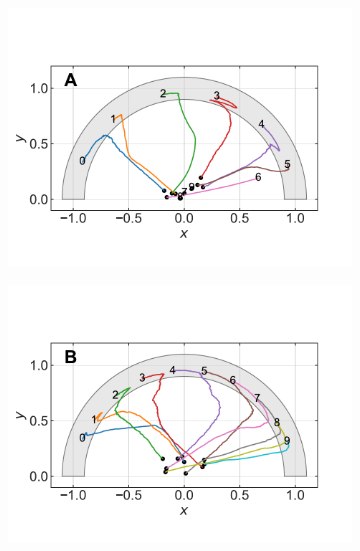 \documentclass[11pt,twocolumn,twoside]{opticajnl}
\begin{document}
\begin{figure}[H]
    \centering
         \begin{subfigure}[b]{0.49\linewidth}
            \centering
            \includegraphics[width=1.1\textwidth]{Figuras/pesos_sigma_0.5_epochs_100000_lr_0.001.pdf}
         \end{subfigure}
         \begin{subfigure}[b]{0.49\linewidth}
            \centering
            \includegraphics[width=1.1\textwidth]{Figuras/pesos_sigma_1_epochs_100000_lr_0.001.pdf}
         \end{subfigure}
         \begin{subfigure}[b]{0.49\linewidth}
            \centering

\end{subfigure}
\end{figure}
\end{document}
